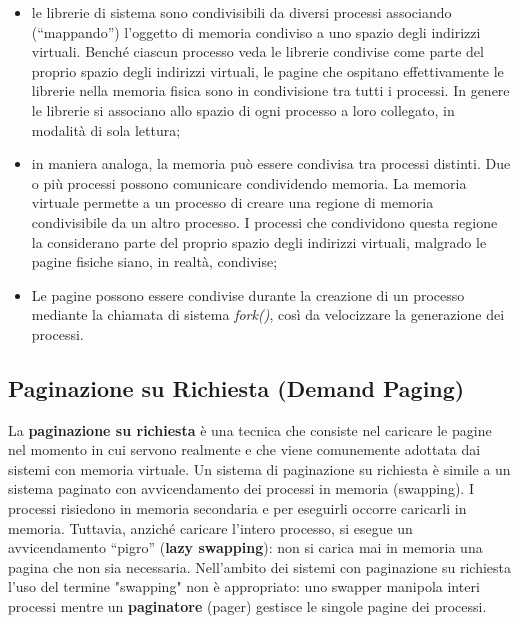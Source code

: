 \documentclass{article}
\begin{document}
			\begin{itemize}
				\item le librerie di sistema sono condivisibili da diversi processi associando (“mappando”) l’oggetto di memoria condiviso a uno spazio degli indirizzi virtuali. Benché ciascun processo veda le librerie condivise come parte del proprio spazio degli indirizzi virtuali, le pagine che ospitano effettivamente le librerie nella memoria fisica sono in condivisione tra tutti i processi. In genere le librerie si associano allo spazio di ogni processo a loro collegato, in modalità di sola lettura;
			   \item in maniera analoga, la memoria può essere condivisa tra processi distinti. Due o più processi possono comunicare condividendo memoria. La memoria virtuale permette a un processo di creare una regione di memoria condivisibile da un altro processo. I processi che condividono questa regione la considerano parte del proprio spazio degli indirizzi virtuali, malgrado le pagine fisiche siano, in realtà, condivise;
			   \item Le pagine possono essere condivise durante la creazione di un processo mediante la chiamata di sistema \textit{fork()}, così da velocizzare la generazione dei processi.
			\end{itemize}

		\subsection{Paginazione su Richiesta (Demand Paging)}

			La \textbf{paginazione su richiesta} è una tecnica che consiste nel caricare le pagine nel momento in cui servono realmente e che viene comunemente adottata dai sistemi con memoria virtuale. Un sistema di paginazione su richiesta è simile a un sistema paginato con avvicendamento dei processi in memoria (swapping). I processi risiedono in memoria secondaria e per eseguirli occorre caricarli in memoria. Tuttavia, anziché caricare l’intero processo, si esegue un avvicendamento “pigro” (\textbf{lazy swapping}): non si carica mai in memoria una pagina che non sia necessaria. Nell’ambito dei sistemi con paginazione su richiesta l’uso del termine "swapping" non è appropriato: uno swapper manipola interi processi mentre un \textbf{paginatore} (pager) gestisce le singole pagine dei processi.
\end{document}
